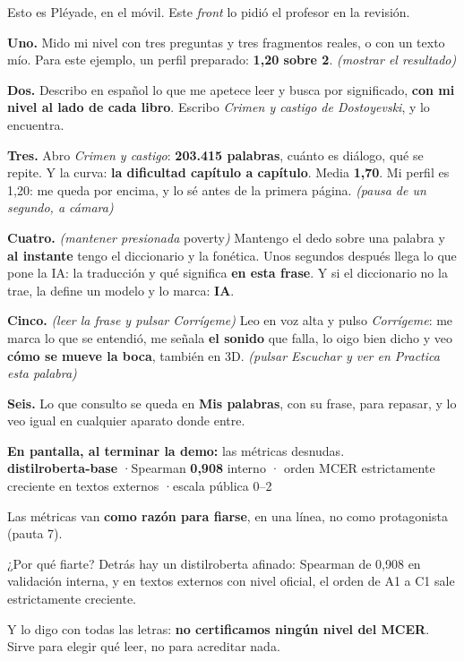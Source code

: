 \documentclass[11pt,a4paper]{article}
\begin{document}
\begin{dice}
Esto es Pléyade, en el móvil. Este \emph{front} lo pidió el profesor en la
revisión.

\textbf{Uno.} Mido mi nivel con tres preguntas y tres fragmentos reales, o con un texto mío.
Para este ejemplo, un perfil preparado: \textbf{1,20 sobre 2}. \emph{(mostrar el resultado)}

\textbf{Dos.} Describo en español lo que me apetece leer y busca por significado,
\textbf{con mi nivel al lado de cada libro}. Escribo \emph{Crimen y castigo de Dostoyevski},
y lo encuentra.

\textbf{Tres.} Abro \emph{Crimen y castigo}: \textbf{203.415 palabras}, cuánto es diálogo, qué se repite. Y la curva: \textbf{la
dificultad capítulo a capítulo}. Media \textbf{1,70}. Mi perfil es 1,20: me queda
por encima, y lo sé antes de la primera página. \emph{(pausa de un segundo, a cámara)}

\textbf{Cuatro.} \emph{(mantener presionada} poverty\emph{)} Mantengo el dedo sobre una palabra y \textbf{al instante}
tengo el diccionario y la fonética. Unos segundos después llega lo que pone
la IA: la traducción y qué significa \textbf{en esta frase}. Y si el diccionario no la
trae, la define un modelo y lo marca: \textbf{IA}.

\textbf{Cinco.} \emph{(leer la frase y pulsar Corrígeme)} Leo en voz alta y pulso
\emph{Corrígeme}: me marca lo que se entendió, me señala \textbf{el
sonido} que falla, lo oigo bien dicho y veo \textbf{cómo se mueve la boca}, también
en 3D.
\emph{(pulsar Escuchar y ver en Practica esta palabra)}

\textbf{Seis.} Lo que consulto se queda en \textbf{Mis palabras}, con su frase, para
repasar, y lo veo igual en cualquier aparato donde entre.
\end{dice}

\begin{ve}
\textbf{En pantalla, al terminar la demo:} las métricas desnudas.\\[3pt]
\textbf{distilroberta-base} \quad·\quad Spearman \textbf{0,908} interno \quad·\quad
orden MCER estrictamente creciente en textos externos \quad·\quad escala pública 0--2
\end{ve}

\begin{ve}
Las métricas van \textbf{como razón para fiarse}, en una línea, no como
protagonista (pauta 7).
\end{ve}

\begin{dice}
¿Por qué fiarte? Detrás hay un distilroberta afinado: Spearman de 0,908 en
validación interna, y en textos externos con nivel oficial, el orden de A1 a
C1 sale estrictamente creciente.

Y lo digo con todas las letras: \textbf{no certificamos ningún nivel del MCER}.
Sirve para elegir qué leer, no para acreditar nada.
\end{dice}
\end{document}
